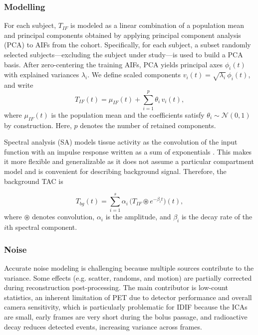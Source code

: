 \subsubsection{Modelling}
For each subject, \(T_{IF}\) is modeled as a linear combination of a population mean and principal components obtained by applying principal component analysis (PCA) to AIFs from the cohort.
Specifically, for each subject, a subset randomly selected subjects—excluding the subject under study—is used to build a PCA basis.
After zero-centering the training AIFs, PCA yields principal axes \(\phi_i(t)\) with explained variances \(\lambda_i\).
We define scaled components \(v_i(t) = \sqrt{\lambda_i}\,\phi_i(t)\), and write
\begin{equation}
	T_{IF}(t) = \mu_{IF}(t) + \sum_{i=1}^p \theta_i\,v_i(t),
\end{equation}
where \(\mu_{IF}(t)\) is the population mean and the coefficients satisfy \(\theta_i \sim \mathcal{N}(0,1)\) by construction.
Here, \(p\) denotes the number of retained components.

%
Spectral analysis (SA) models tissue activity as the convolution of the input function with an impulse response written as a sum of exponentials \cite{TODO}.
This makes it more flexible and generalizable as it does not assume a particular compartment model and is convenient for describing background signal.
Therefore, the background TAC is

\begin{equation}
	T_{bg}(t) = \sum_{i=1}^s \alpha_{i} \,\bigl(T_{IF} \circledast e^{-\beta_{i} t}\bigr)(t),
\end{equation}
where \(\circledast\) denotes convolution, \(\alpha_i\) is the amplitude, and \(\beta_i\) is the decay rate of the \(i\)th spectral component.

\subsubsection{Noise}
Accurate noise modeling is challenging because multiple sources contribute to the variance.
Some effects (e.g. scatter, randoms, and motion) are partially corrected during reconstruction post-processing.
The main contributor is low-count statistics, an inherent limitation of PET due to detector performance and overall camera sensitivity, which is particularly problematic for IDIF because the ICAs are small, early frames are very short during the bolus passage, and radioactive decay reduces detected events, increasing variance across frames.

